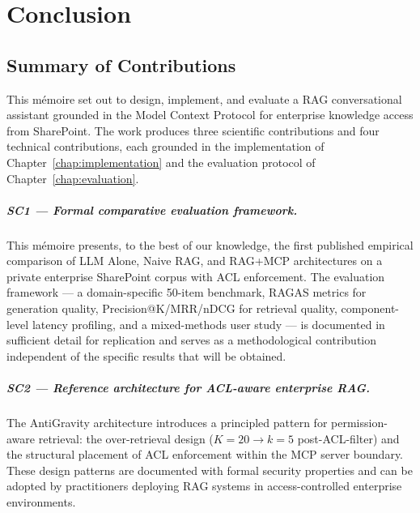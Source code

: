 \chapter{Conclusion}
\label{chap:conclusion}

\section{Summary of Contributions}
\label{sec:conc-contributions}

This mémoire set out to design, implement, and evaluate a RAG conversational assistant grounded in the Model Context Protocol for enterprise knowledge access from SharePoint. The work produces three scientific contributions and four technical contributions, each grounded in the implementation of Chapter~\ref{chap:implementation} and the evaluation protocol of Chapter~\ref{chap:evaluation}.

\paragraph{SC1 --- Formal comparative evaluation framework.} This mémoire presents, to the best of our knowledge, the first published empirical comparison of LLM Alone, Naive RAG, and RAG+MCP architectures on a private enterprise SharePoint corpus with ACL enforcement. The evaluation framework --- a domain-specific 50-item benchmark, RAGAS metrics for generation quality, Precision@K/MRR/nDCG for retrieval quality, component-level latency profiling, and a mixed-methods user study --- is documented in sufficient detail for replication and serves as a methodological contribution independent of the specific results that will be obtained.

\paragraph{SC2 --- Reference architecture for ACL-aware enterprise RAG.} The AntiGravity architecture introduces a principled pattern for permission-aware retrieval: the over-retrieval design ($K=20 \to k=5$ post-ACL-filter) and the structural placement of ACL enforcement within the MCP server boundary. These design patterns are documented with formal security properties and can be adopted by practitioners deploying RAG systems in access-controlled enterprise environments.

